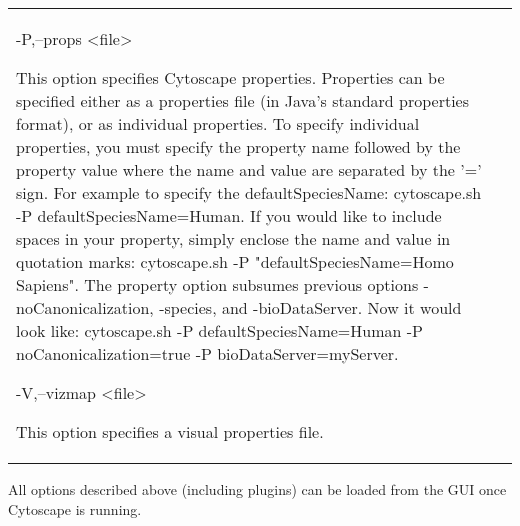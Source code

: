 \begin{table}
\begin{tabular}{|l|l|}
-P,--props <file>
    

This option specifies Cytoscape properties. Properties can be specified either as
a properties file (in Java's standard properties format), or as individual
properties. To specify individual properties, you must specify the property name
followed by the property value where the name and value are separated by the '='
sign. For example to specify the defaultSpeciesName: cytoscape.sh -P
defaultSpeciesName=Human. If you would like to include spaces in your property,
simply enclose the name and value in quotation marks: cytoscape.sh -P
"defaultSpeciesName=Homo Sapiens". The property option subsumes previous options
-noCanonicalization, -species, and -bioDataServer. Now it would look like:
cytoscape.sh -P defaultSpeciesName=Human -P noCanonicalization=true -P
bioDataServer=myServer.

-V,--vizmap <file>
    

This option specifies a visual properties file.
\end{tabular}
\end{table}
All options described above (including plugins) can be loaded from the GUI once
Cytoscape is running.